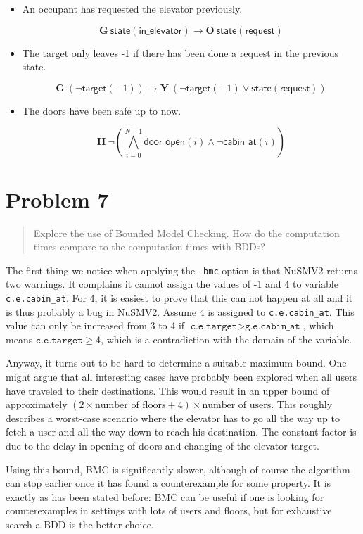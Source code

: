 \documentclass[a4paper,10pt]{article}
\newcommand{\LTLG}{\mathbf{G~}}
\newcommand{\LTLO}{\mathbf{O~}}
\newcommand{\LTLY}{\mathbf{Y~}}
\newcommand{\LTLH}{\mathbf{H~}}
\newcommand{\conjall}[2]{\mathop{\bigwedge}\limits_{#1}^{#2}}
\newcommand{\dooropen}[1]{\mathsf{door\_open}(#1)}
\newcommand{\cabinat}[1]{\mathsf{cabin\_at}(#1)}
\newcommand{\target}[1]{\mathsf{target}(#1)}
\newcommand{\state}[1]{\mathsf{state}(\mathsf{#1})}
\newcommand{\imply}{\rightarrow}
\begin{document}
	\begin{itemize}
		\item
			An occupant has requested the elevator previously.
		
			\[
				\LTLG \state{in\_elevator} \imply \LTLO \state{request}
			\]
		
		\item
			The target only leaves -1 if there has been done a request in the previous state.
			
			\[
				\LTLG (\neg \target{-1}) \imply \LTLY (\neg \target{-1} \vee \state{request})
			\]
		
		\item
			The doors have been safe up to now.
			
			\[
				\LTLH \neg \left( \conjall{i=0}{N-1} \dooropen{i} \wedge \neg \cabinat{i} \right)
			\]
	\end{itemize}
	
	\section{Problem 7}
	
	\begin{quote}
		Explore the use of Bounded Model Checking. How do the computation times compare to the computation times with BDDs?
	\end{quote}

	
	The first thing we notice when applying the \texttt{-bmc} option is that NuSMV2 returns two warnings. It complains it cannot assign the values of -1 and 4 to variable \texttt{c.e.cabin\_at}. For 4, it is easiest to prove that this can not happen at all and it is thus probably a bug in NuSMV2. Assume 4 is assigned to \texttt{c.e.cabin\_at}. This value can only be increased from 3 to 4 if \(\texttt{c.e.target} > \texttt{g.e.cabin\_at}\), which means \(\texttt{c.e.target} \ge 4\), which is a contradiction with the domain of the variable.
	
	Anyway, it turns out to be hard to determine a suitable maximum bound. One might argue that all interesting cases have probably been explored when all users have traveled to their destinations. This would result in an upper bound of approximately \((2 \times \textrm{number of floors} + 4) \times \textrm{number of users}\). This roughly describes a worst-case scenario where the elevator has to go all the way up to fetch a user and all the way down to reach his destination. The constant factor is due to the delay in opening of doors and changing of the elevator target.
	
	Using this bound, BMC is significantly slower, although of course the algorithm can stop earlier once it has found a counterexample for some property. It is exactly as has been stated before: BMC can be useful if one is looking for counterexamples in settings with lots of users and floors, but for exhaustive search a BDD is the better choice.
\end{document}
